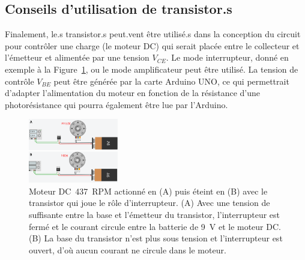 \documentclass[english,french,12pt]{article}
\begin{document}
\subsection*{Conseils d'utilisation de transistor.s}
Finalement, le.s transistor.s peut.vent être utilisé.s dans la conception du circuit pour contrôler une charge (le moteur DC) qui serait placée entre le collecteur et l'émetteur et alimentée par une tension $V_{CE}$. Le mode interrupteur, donné en exemple à la Figure~\ref{fig:InterrupteurMoteur}, ou le mode amplificateur peut être utilisé. La tension de contrôle $V_{BE}$ peut être générée par la carte Arduino UNO, ce qui permettrait d’adapter l’alimentation du moteur en fonction de la résistance d’une photorésistance qui pourra également être lue par l’Arduino.

\begin{figure}[h]
    \centering
    \includegraphics[width=0.35\textwidth]{Projets de conception/InterrupteurMoteur.png}
    \caption{Moteur DC~437~RPM actionné en (A) puis éteint en (B) avec le transistor qui joue le rôle d'interrupteur. (A) Avec une tension de suffisante entre la base et l'émetteur du transistor, l’interrupteur est fermé et le courant circule entre la batterie de \SI{9}{\volt} et le moteur DC. (B) La base du transistor n'est plus sous tension et l'interrupteur est ouvert, d'où aucun courant ne circule dans le moteur.}
    \label{fig:InterrupteurMoteur}
\end{figure}
\end{document}
